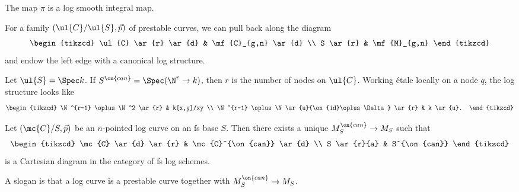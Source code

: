 \begin{thm}
    The map \(\pi\) is a log smooth integral map.
\end{thm}

\begin{defn}
    For a family \((\ul{C}/\ul{S}, \vec{p})\) of prestable curves, we can pull back along the diagram
    \begin{equation*}
    \begin{tikzcd}
        \ul{C} \ar{r} \ar{d} & \mf{C}_{g,n} \ar{d} \\
        S \ar{r} & \mf{M}_{g,n}
    \end{tikzcd}
    \end{equation*}
    and endow the left edge with a canonical log structure.
\end{defn}

\begin{rmk}
    Let \(\ul{S} = \Spec k\). If \(S^{\on{can}} = \Spec (\N^r \to k)\), then \(r\) is the number of nodes on \(\ul{C}\). Working \'etale locally on a node \(q\), the log structure looks like
    \begin{equation*}
    \begin{tikzcd}
        \N^{r-1} \oplus \N^2 \ar{r} & k[x,y]/xy \\
        \N^{r-1} \oplus \N \ar{u}{\on{id}\oplus\Delta} \ar{r} & k \ar{u}.
    \end{tikzcd}
    \end{equation*}
\end{rmk}

\begin{thm}
    Let \((\mc{C}/S, \vec{p})\) be an \(n\)-pointed log curve on an fs base \(S\). Then there exists a unique \(M_S^{\on{can}} \to M_S\) such that
    \begin{equation*}
    \begin{tikzcd}
        \mc{C} \ar{d} \ar{r} & \mc{C}^{\on{can}} \ar{d} \\
        S \ar{r}{a} & S^{\on{can}}
    \end{tikzcd}
    \end{equation*}
    is a Cartesian diagram in the category of fs log schemes.
\end{thm}

A slogan is that a log curve is a prestable curve together with \(M_S^{\on{can}} \to M_S\).

